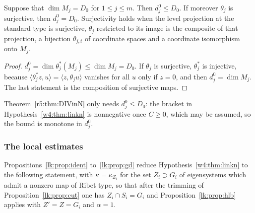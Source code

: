 \begin{proposition}\label{lk:prop:d0}
Suppose that $\dim M_j=D_0$ for $1\le j\le m$. Then $d^0_j\le D_0$. If moreover $\theta_j$ is surjective, then $d^0_j=D_0$. Surjectivity holds when the level projection at the standard type is surjective, $\theta_j$ restricted to its image is the composite of that projection, a bijection $\theta_{j,t}$ of coordinate spaces and a coordinate isomorphism onto $M_j$.
\end{proposition}

\begin{proof}
$d^0_j=\dim\theta_j^*(M_j)\le\dim M_j=D_0$. If $\theta_j$ is surjective, $\theta_j^*$ is injective, because $\langle\theta_j^*z,u\rangle=\langle z,\theta_ju\rangle$ vanishes for all $u$ only if $z=0$, and then $d^0_j=\dim M_j$. The last statement is the composition of surjective maps.
\end{proof}

Theorem~\ref{r5:thm:DIVinN} only needs $d^0_j\le D_0$: the bracket in Hypothesis~\ref{w4:thm:linkn} is nonnegative once $C\ge0$, which may be assumed, so the bound is monotone in $d^0_j$.

\subsubsection*{The local estimates}

Propositions~\ref{lk:prop:ident} to~\ref{lk:prop:gd} reduce Hypothesis~\ref{w4:thm:linkn} to the following statement, with $\kappa=\kappa_{Z_i}$ for the set $Z_i\supset G_i$ of eigensystems which admit a nonzero map of Ribet type, so that after the trimming of Proposition~\ref{lk:prop:cut} one has $Z_i\cap S_i=G_i$ and Proposition~\ref{lk:prop:hlb} applies with $Z'=Z=G_i$ and $\alpha=1$.

